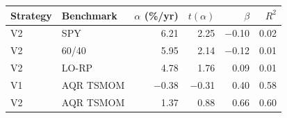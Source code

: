 \begin{tabular}{llrrrr}
\toprule
Strategy & Benchmark & $\alpha$ (\%/yr) & $t(\alpha)$ & $\beta$ & $R^2$ \\
\midrule
V2 & SPY & 6.21 & 2.25 & $-$0.10 & 0.02 \\
V2 & 60/40 & 5.95 & 2.14 & $-$0.12 & 0.01 \\
V2 & LO-RP & 4.78 & 1.76 & 0.09 & 0.01 \\
V1 & AQR TSMOM & $-$0.38 & $-$0.31 & 0.40 & 0.58 \\
V2 & AQR TSMOM & 1.37 & 0.88 & 0.66 & 0.60 \\
\bottomrule
\end{tabular}
